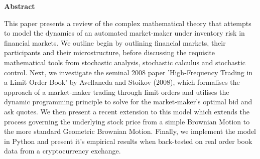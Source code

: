 \thispagestyle{plain}
\mbox{}
\vspace{60mm}
\begin{center}
    \textbf{Abstract}
\end{center}
This paper presents a review of the complex mathematical theory that attempts to model the dynamics of an automated market-maker under inventory risk in financial markets. We outline begin by outlining financial markets, their participants and their microstructure, before discussing the requisite mathematical tools from stochastic analysis, stochastic calculus and stochastic control. Next, we investigate the seminal 2008 paper 'High-Frequency Trading in a Limit Order Book' by Avellaneda and Stoikov (2008), which formalises the approach of a market-maker trading through limit orders and utilises the dynamic programming principle to solve for the market-maker's optimal bid and ask quotes. We then present a recent extension to this model which extends the process governing the underlying stock price from a simple Brownian Motion to the more standard Geometric Brownian Motion. Finally, we implement the model in Python and present it's empirical results when back-tested on real order book data from a cryptocurrency exchange.
\newpage